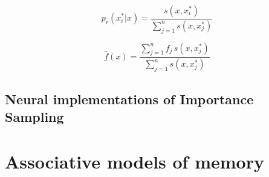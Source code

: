 \documentclass[10pt,letterpaper]{article}
\begin{document}

\begin{equation}
	p_{r}(x^{*}_{i}|x)=\frac{s(x,x^{*}_{i})}{\sum^{n}_{j=1}s(x,x^{*}_{j})}
\end{equation}

\cite{ashby1995categorization}


\begin{equation}
	\hat{f}(x)=\frac{\sum^{n}_{j=1}f_{j}\,s(x,x^{*}_{j})}{\sum^{n}_{j=1}s(x,x^{*}_{j})}
\end{equation}



\cite{neal1993probabilistic,Shi2010}

\subsection{Neural implementations of Importance Sampling}
\cite{Shi2009}









\section{Associative models of memory}
\end{document}
